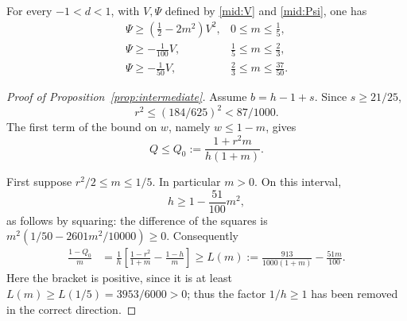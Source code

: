 \begin{lemma}\label{mid:pointwise}
For every \(-1<d<1\), with \(V,\Psi\) defined by
\eqref{mid:V} and \eqref{mid:Psi}, one has
\begin{equation}\label{mid:pointwise-bounds}
 \begin{array}{ll}
 \Psi\ge(\frac12-2m^2)V^2,&0\le m\le\frac15,\\[2pt]
 \Psi\ge-\frac1{100}V,&\frac15\le m\le\frac23,\\[2pt]
 \Psi\ge-\frac1{50}V,&\frac23\le m\le\frac{37}{50}.
 \end{array}
\end{equation}
\end{lemma}

\begin{proof}[Proof of Proposition~\ref{prop:intermediate}]
Assume \(b=h-1+s\). Since \(s\ge21/25\),
\begin{equation}\label{mid:r-bound}
 r^2\le(184/625)^2<87/1000.
\end{equation}
The first term of the bound on \(w\), namely \(w\le1-m\), gives
\begin{equation}\label{mid:Qzero}
 Q\le Q_0:=\frac{1+r^2m}{h(1+m)}.
\end{equation}

First suppose \(r^2/2\le m\le1/5\). In particular \(m>0\).
On this interval,
\[
 h\ge1-\frac{51}{100}m^2,
\]
as follows by squaring: the difference of the squares is
\(m^2(1/50-2601m^2/10000)\ge0\). Consequently
\begin{align}
 \frac{1-Q_0}{m}
 &=\frac1h\left[\frac{1-r^2}{1+m}-\frac{1-h}{m}\right]
 \ge L(m):=\frac{913}{1000(1+m)}-\frac{51m}{100}.
 \label{mid:small-margin-left}
\end{align}
Here the bracket is positive, since it is at least
\(L(m)\ge L(1/5)=3953/6000>0\); thus the factor \(1/h\ge1\)
has been removed in the correct direction.


\end{proof}
